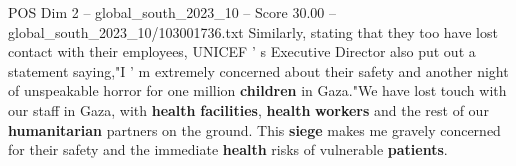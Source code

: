 \begin{textsample}{POS Dim 2 – global\_south\_2023\_10 – Score 30.00 – global\_south\_2023\_10/103001736.txt}
Similarly, stating that they too have lost contact with their employees, UNICEF ' s Executive Director also put out a statement saying,"I ' m extremely concerned about their safety and another night of unspeakable horror for one million \textbf{children} in Gaza."We have lost touch with our staff in Gaza, with \textbf{health} \textbf{facilities}, \textbf{health} \textbf{workers} and the rest of our \textbf{humanitarian} partners on the ground.
This \textbf{siege} makes me gravely concerned for their safety and the immediate \textbf{health} risks of vulnerable \textbf{patients}.

\end{textsample}
